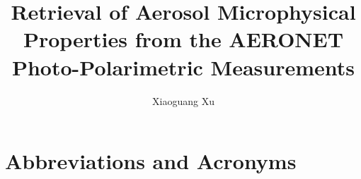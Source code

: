 \documentclass[phd, print]{nuthesis}
\begin{document}
\frontmatter

\title{Retrieval of Aerosol Microphysical Properties from the AERONET
Photo-Polarimetric Measurements}
\author{Xiaoguang Xu}
\maketitle

%


\tableofcontents*
\begin{onehalfspacing}
\listoffigures
\listoftables
\end{onehalfspacing}

\mainmatter


 
 
 
 
 


\backmatter

\appendix

\chapter{Abbreviations and Acronyms}
\end{document}
